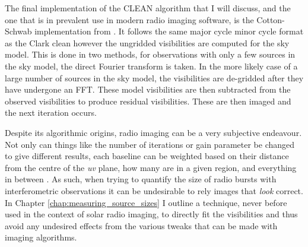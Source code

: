 The final implementation of the CLEAN algorithm that I will discuss, and the one that is in prevalent use in modern radio imaging software, is the Cotton-Schwab implementation from \cite{Schwab1984}. It follows the same major cycle minor cycle format as the Clark clean however the ungridded visibilities are computed for the sky model. This is done in two methods, for observations with only a few sources in the sky model, the direct Fourier transform is taken. In the more likely case of a large number of sources in the sky model, the visibilities are de-gridded after they have undergone an FFT. These model visibilities are then subtracted from the observed visibilities to produce residual visibilities. These are then imaged and the next iteration occurs.

Despite its algorithmic origins, radio imaging can be a very subjective endeavour. Not only can things like the number of iterations or gain parameter be changed to give different results, each baseline can be weighted based on their distance from the centre of the \textit{uv} plane, how many are in a given region, and everything in between \citep{Briggs1995}. As such, when trying to quantify the size of radio bursts with interferometric observations it can be undesirable to rely images that \textit{look} correct. In Chapter \ref{chap:measuring_source_sizes} I outline a technique, never before used in the context of solar radio imaging, to directly fit the visibilities and thus avoid any undesired effects from the various tweaks that can be made with imaging algorithms.